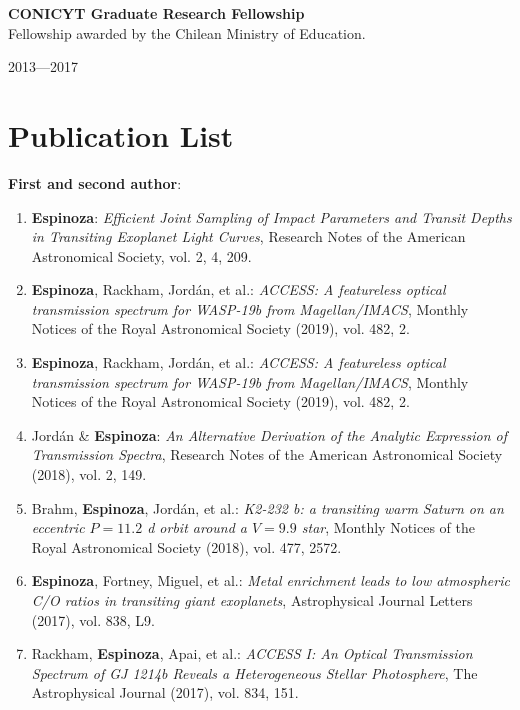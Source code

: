\documentclass[12pt, a4paper]{article} %
\begin{document}
\begin{minipage}[t]{0.7\textwidth}
\begin{flushleft}%
  \setlength{\leftskip}{0.2cm}%
\textbf{CONICYT Graduate Research Fellowship}\\
Fellowship awarded by the Chilean Ministry of Education.
\end{flushleft}
\end{minipage}
\begin{minipage}[t]{0.3\textwidth}
\hfill 2013---2017
\end{minipage}

\section*{Publication List}
\begin{flushleft}%
  \setlength{\leftskip}{0.2cm}%
\textbf{First and second author}:
\begin{enumerate}
\setlength\itemsep{0.05cm}
\item \textbf{Espinoza}: \textit{Efficient Joint Sampling of Impact Parameters and Transit Depths in Transiting Exoplanet Light Curves}, Research Notes of the American Astronomical Society, vol. 2, 4, 209.
\item \textbf{Espinoza}, Rackham, Jord\'an, et al.: \textit{ACCESS: A featureless optical transmission spectrum for WASP-19b from Magellan/IMACS}, Monthly Notices of the Royal Astronomical Society (2019), vol. 482, 2.
\item \textbf{Espinoza}, Rackham, Jord\'an, et al.: \textit{ACCESS: A featureless optical transmission spectrum for WASP-19b from Magellan/IMACS}, Monthly Notices of the Royal Astronomical Society (2019), vol. 482, 2.
\item Jord\'an \& \textbf{Espinoza}: \textit{An Alternative Derivation of the Analytic Expression of Transmission Spectra}, Research Notes of the American Astronomical Society (2018), vol. 2, 149.
\item Brahm, \textbf{Espinoza}, Jord\'an, et al.: \textit{K2-232 b: a transiting warm Saturn on an eccentric $P = 11.2$ d orbit around a $V = 9.9$ star}, Monthly Notices of the Royal Astronomical Society (2018), vol. 477, 2572.
\item \textbf{Espinoza}, Fortney, Miguel, et al.: \textit{Metal enrichment leads to low atmospheric C/O ratios in transiting giant exoplanets}, Astrophysical Journal Letters (2017), vol. 838, L9.
\item Rackham, \textbf{Espinoza}, Apai, et al.: \textit{ACCESS I: An Optical Transmission Spectrum of GJ 1214b Reveals a Heterogeneous Stellar Photosphere}, The Astrophysical Journal (2017), vol. 834, 151.

\end{enumerate}
\end{flushleft}
\end{document}
